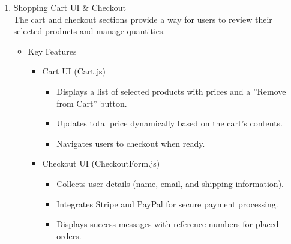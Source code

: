 \documentclass{llncs}
\begin{document}
\begin{enumerate}
\begin{itemize}
\begin{itemize}
\begin{itemize}
                              \end{itemize}
                    \end{itemize}
          \end{itemize}

    \item Shopping Cart UI \& Checkout\\
          The cart and checkout sections provide a way for users to review their selected products and manage quantities.
          \begin{itemize}
              \item Key Features
                    \begin{itemize}
                        \item Cart UI (Cart.js)
                              \begin{itemize}
                                  \item Displays a list of selected products with prices and a ''Remove from Cart'' button.
                                  \item Updates total price dynamically based on the cart's contents.
                                  \item Navigates users to checkout when ready.
                              \end{itemize}
                        \item Checkout UI (CheckoutForm.js)
                              \begin{itemize}
                                  \item Collects user details (name, email, and shipping information).
                                  \item Integrates Stripe and PayPal for secure payment processing.
                                  \item Displays success messages with reference numbers for placed orders.
                              \end{itemize}
                    \end{itemize}
          \end{itemize}


\end{enumerate}
\end{document}
